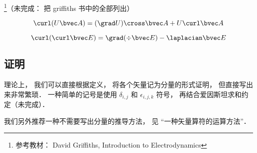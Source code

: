 
\footnote{参考教材： David Griffiths, Introduction to Electrodynamics}（未完成： 把 griffiths 书中的全部列出）

\begin{equation}
\curl(U\bvec A) = (\grad U) \cross\bvec A + U \curl\bvec A
\end{equation}

\begin{equation}
\curl(\curl \bvec E) = \grad(\div\bvec E) - \laplacian \bvec E
\end{equation}

\subsection{证明}
理论上， 我们可以直接根据定义， 将各个矢量记为分量的形式证明， 但直接写出来非常繁琐． 一种简单的记号是使用 $\delta_{i,j}$ 和 $\epsilon_{i,j,k}$ 符号， 再结合爱因斯坦求和约定（未完成）．

我们另外推荐一种不需要写出分量的推导方法， 见 “一种矢量算符的运算方法”．

